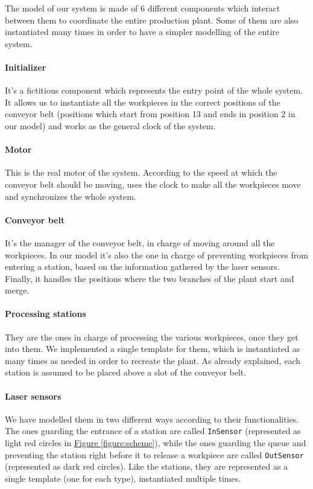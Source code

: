 \documentclass[a4paper]{article}
\newcommand{\figureref}[1]{\textsf{\hyperref[#1]{Figure \ref*{#1}}}}
\begin{document}
    The model of our system is made of 6 different components which interact between them to coordinate the entire production plant. Some of them are also instantiated many times in order to have a simpler modelling of the entire system.

    \paragraph{Initializer} It's a fictitious component which represents the entry point of the whole system. It allows us to instantiate all the workpieces in the correct positions of the conveyor belt (positions which start from position 13 and ends in position 2 in our model) and works as the general clock of the system.

    \paragraph{Motor} This is the real motor of the system. According to the speed at which the conveyor belt should be moving, uses the clock to make all the workpieces move and synchronizes the whole system.

    \paragraph{Conveyor belt} It's the manager of the conveyor belt, in charge of moving around all the workpieces. In our model it's also the one in charge of preventing workpieces from entering a station, based on the information gathered by the laser sensors. Finally, it handles the positions where the two branches of the plant start and merge.

    \paragraph{Processing stations} They are the ones in charge of processing the various workpieces, once they get into them. We implemented a single template for them, which is instantiated as many times as needed in order to recreate the plant. As already explained, each station is assumed to be placed above a slot of the conveyor belt.

    \paragraph{Laser sensors} We have modelled them in two different ways according to their functionalities. The ones guarding the entrance of a station are called \texttt{InSensor} (represented as light red circles in \figureref{figure:scheme}), while the ones guarding the queue and preventing the station right before it to release a workpiece are called \texttt{OutSensor} (represented as dark red circles). Like the stations, they are represented as a single template (one for each type), instantiated multiple times.
\end{document}
